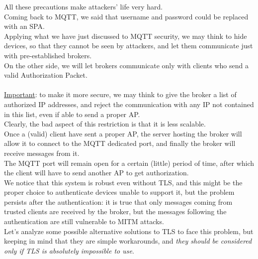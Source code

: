 \documentclass[12pt]{report}
\begin{document}
{{All these precautions make attackers' life very hard.\\

Coming back to MQTT, we said that username and password could be replaced with an SPA.\\
Applying what we have just discussed to MQTT security, we may think to hide devices, so that they cannot be seen by attackers, and let them communicate just with pre-established brokers.\\
On the other side, we will let brokers communicate only with clients who send a valid Authorization Packet.\\\\
\underline{Important}: to make it more secure, we may think to give the broker a list of authorized IP addresses, and reject the communication with any IP not contained in this list, even if able to send a proper AP.\\
Clearly, the bad aspect of this restriction is that it is less scalable.\\

Once a (valid) client have sent a proper AP, the server hosting the broker will allow it to connect to the MQTT dedicated port, and finally the broker will receive messages from it.\\
The MQTT port will remain open for a certain (little) period of time, after which the client will have to send another AP to get authorization.\\

We notice that this system is robust even without TLS, and this might be the proper choice to authenticate devices unable to support it, but the problem persists after the authentication: it is true that only messages coming from trusted clients are received by the broker, but the messages following the authentication are still vulnerable to MITM attacks.\\

Let's analyze some possible alternative solutions to TLS to face this problem, but keeping in mind that they are simple workarounds, and \emph{they should be considered only if TLS is absolutely impossible to use}.

}}
\end{document}
